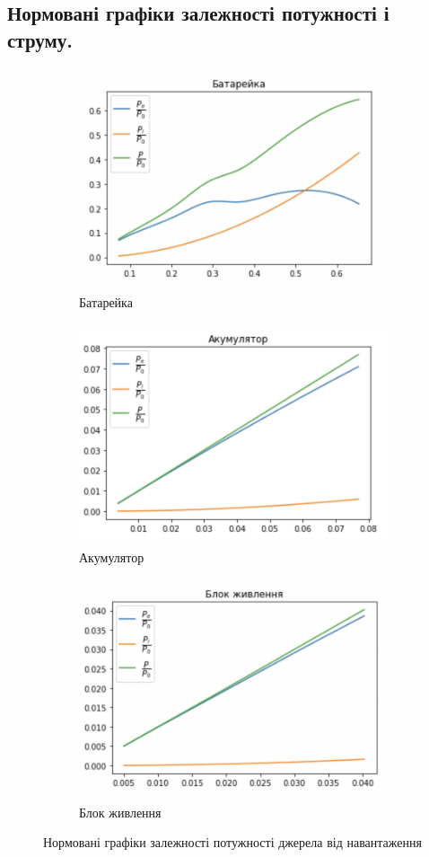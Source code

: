 \documentclass[a4paper,12pt]{article}
\begin{document}
\begin{justify}
	\subsection{Нормовані графіки залежності потужності і струму.}
	 \begin{figure}[!h]
		\centering
		\begin{subfigure}{0.6\linewidth}
			\includegraphics[height=65mm]{media/graph7aaa.png}
    		\caption{Батарейка}
			\label{fig:8a}
    	\end{subfigure}\hfill
    	\begin{subfigure}{0.6\linewidth}
			\includegraphics[height=65mm]{media/graph7bbb.png}
    		\caption{Акумулятор}
			\label{fig:8b}
    	\end{subfigure}\hfill
    	\begin{subfigure}{0.6\linewidth}
			\includegraphics[height=65mm]{media/graph7ccc.png}
    		\caption{Блок живлення}
			\label{fig:8c}
    	\end{subfigure}\hfill
		\caption{Нормовані графіки залежності потужності джерела від навантаження}
		\label{fig:8}
	\end{figure}
		

\end{justify}
\end{document}
